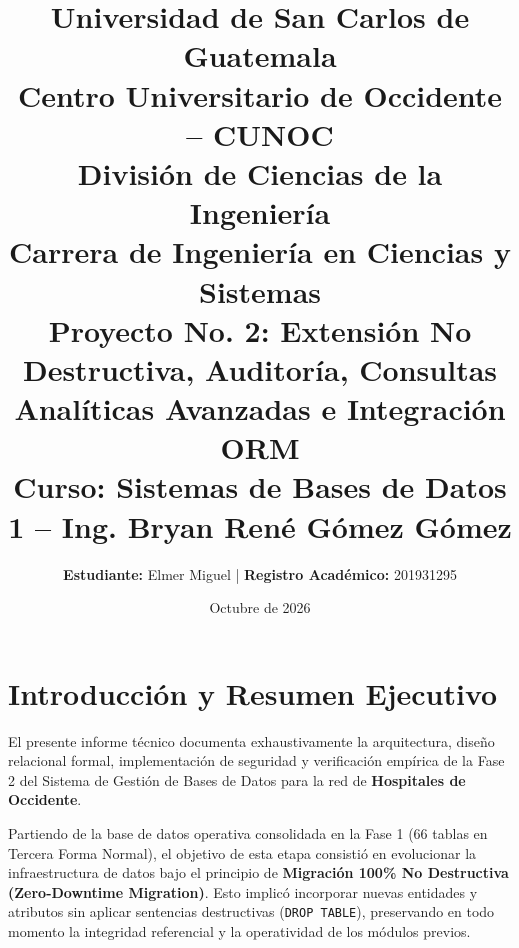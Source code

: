 \documentclass[11pt,a4paper]{article}
\title{
	\textbf{Universidad de San Carlos de Guatemala}\\
	\large Centro Universitario de Occidente -- CUNOC\\
	\large División de Ciencias de la Ingeniería\\
	\large Carrera de Ingeniería en Ciencias y Sistemas\\
	\vspace{0.5cm}
	\textbf{Proyecto No. 2: Extensión No Destructiva, Auditoría, Consultas Analíticas Avanzadas e Integración ORM}\\
	\large Curso: Sistemas de Bases de Datos 1 -- Ing. Bryan René Gómez Gómez
}
\author{\textbf{Estudiante:} Elmer Miguel \quad | \quad \textbf{Registro Académico:} 201931295}
\date{Octubre de 2026}
\begin{document}
\maketitle
\tableofcontents
\newpage

\section{Introducción y Resumen Ejecutivo}
El presente informe técnico documenta exhaustivamente la arquitectura, diseño relacional formal, implementación de seguridad y verificación empírica de la Fase 2 del Sistema de Gestión de Bases de Datos para la red de \textbf{Hospitales de Occidente}.

Partiendo de la base de datos operativa consolidada en la Fase 1 (66 tablas en Tercera Forma Normal), el objetivo de esta etapa consistió en evolucionar la infraestructura de datos bajo el principio de \textbf{Migración 100\% No Destructiva (Zero-Downtime Migration)}. Esto implicó incorporar nuevas entidades y atributos sin aplicar sentencias destructivas (\texttt{DROP TABLE}), preservando en todo momento la integridad referencial y la operatividad de los módulos previos.
\end{document}
